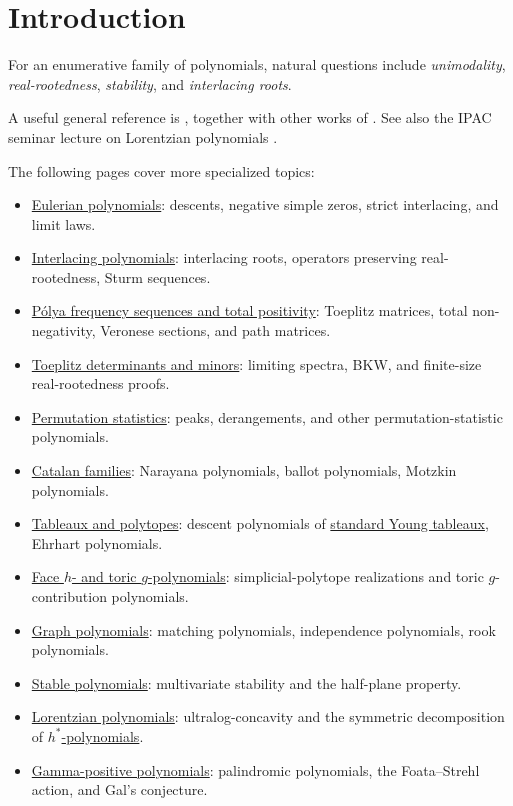 


\section[polynomialRootIntro]{Introduction}

For an enumerative family of polynomials, natural questions include
\emph{unimodality}, \emph{real-rootedness}, \emph{stability}, and
\emph{interlacing roots}.

A useful general reference is \cite{Branden2015}, together with other works
of .  See also the IPAC seminar lecture on Lorentzian
polynomials \cite{IPAC2022LorentzianLecture}.

The following pages cover more specialized topics:
\begin{itemize}
\item \hyperref[eulerianZeros]{Eulerian polynomials}:
  descents, negative simple zeros, strict interlacing, and limit laws.
\item \hyperref[interlacingPolynomials]{Interlacing polynomials}:
  interlacing roots, operators preserving real-rootedness, Sturm sequences.
\item \hyperref[polyaFrequency]{Pólya frequency sequences and total positivity}:
  Toeplitz matrices, total non-negativity, Veronese sections, and path matrices.
\item \hyperref[toeplitzDeterminants]{Toeplitz determinants and minors}:
  limiting spectra, BKW, and finite-size real-rootedness proofs.
\item \hyperref[realRootedWords]{Permutation statistics}:
  peaks, derangements, and other permutation-statistic polynomials.
\item \hyperref[realRootedCatalan]{Catalan families}:
  Narayana polynomials, ballot polynomials, Motzkin polynomials.
\item \hyperref[realRootedTableaux]{Tableaux and polytopes}:
  descent polynomials of \hyperref[standardYoungTableau]{standard Young tableaux},
  Ehrhart polynomials.
\item \hyperref[polytopeFacePolynomials]{Face $h$- and toric $g$-polynomials}:
  simplicial-polytope realizations and toric $g$-contribution polynomials.
\item \hyperref[realRootedMatching]{Graph polynomials}:
  matching polynomials, independence polynomials, rook polynomials.
\item \hyperref[stablePolynomial]{Stable polynomials}:
  multivariate stability and the half-plane property.
\item \hyperref[lorentzianPolynomial]{Lorentzian polynomials}:
  ultralog-concavity and the symmetric decomposition of
  \hyperref[hStarPolynomial]{$h^*$-polynomials}.
\item \hyperref[gammaPositivity]{Gamma-positive polynomials}:
  palindromic polynomials, the Foata--Strehl action, and Gal's conjecture.
\end{itemize}

